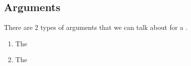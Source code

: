\subsection{Arguments}\label{subsec:Complex_Number_Arguments}
There are 2 types of arguments that we can talk about for a .
\begin{enumerate}[noitemsep]
\item The 
\item The 
\end{enumerate}


